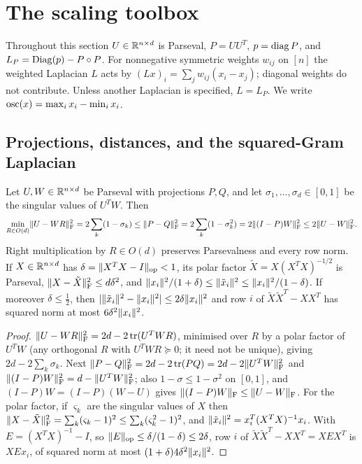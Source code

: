 \section{The scaling toolbox}\label{sec:toolbox}

Throughout this section $U\in\mathbb R^{n\times d}$ is Parseval, $P=UU^T$,
$p=\operatorname{diag} P$, and $L_P=\operatorname{Diag}(p)-P\circ P$. For nonnegative symmetric weights
$w_{ij}$ on $[n]$ the weighted Laplacian $L$ acts by
$(Lx)_i=\sum_jw_{ij}(x_i-x_j)$; diagonal weights do not contribute. Unless
another Laplacian is specified, $L=L_P$. We write $\operatorname{osc}(x)=\max_ix_i-\min_ix_i$.

\subsection{Projections, distances, and the squared-Gram Laplacian}

\begin{lemma}\label{lem:align}
Let $U,W\in\mathbb R^{n\times d}$ be Parseval with projections $P,Q$, and let
$\sigma_1,\dots,\sigma_d\in[0,1]$ be the singular values of $U^TW$. Then
\[
 \min_{R\in O(d)}\lVert U-WR\rVert_{\mathrm F}^2=2\sum_k(1-\sigma_k)\le
 \lVert P-Q\rVert_{\mathrm F}^2=2\sum_k(1-\sigma_k^2)=2\lVert (I-P)W\rVert_{\mathrm F}^2\le2\lVert U-W\rVert_{\mathrm F}^2 .
\]
Right multiplication by $R\in O(d)$ preserves Parsevalness and every row norm.
If $X\in\mathbb R^{n\times d}$ has $\delta=\lVert X^TX-I\rVert_{\mathrm{op}}<1$, its polar factor
$\tilde X=X(X^TX)^{-1/2}$ is Parseval, $\lVert X-\tilde X\rVert_{\mathrm F}^2\le d\delta^2$, and
$\lVert x_i\rVert^2/(1+\delta)\le\lVert \tilde x_i\rVert^2\le\lVert x_i\rVert^2/(1-\delta)$. If
moreover $\delta\le\frac12$, then $|\lVert \tilde x_i\rVert^2-\lVert x_i\rVert^2|\le2\delta\lVert x_i\rVert^2$
and row $i$ of $\tilde X\tilde X^T-XX^T$ has squared norm at most
$6\delta^2\lVert x_i\rVert^2$.
\end{lemma}

\begin{proof}
$\lVert U-WR\rVert_{\mathrm F}^2=2d-2\operatorname{tr}(U^TWR)$, minimised over $R$ by a polar factor of $U^TW$ (any orthogonal $R$ with $U^TWR\succeq0$; it need not be unique),
giving $2d-2\sum_k\sigma_k$. Next $\lVert P-Q\rVert_{\mathrm F}^2=2d-2\operatorname{tr}(PQ)=2d-2\lVert U^TW\rVert_{\mathrm F}^2$
and $\lVert (I-P)W\rVert_{\mathrm F}^2=d-\lVert U^TW\rVert_{\mathrm F}^2$; also $1-\sigma\le1-\sigma^2$ on $[0,1]$,
and $(I-P)W=(I-P)(W-U)$ gives $\lVert (I-P)W\rVert_{\mathrm F}\le\lVert U-W\rVert_{\mathrm F}$. For the polar factor, if $\varsigma_k$ are the singular values of $X$
then $\lVert X-\tilde X\rVert_{\mathrm F}^2=\sum_k(\varsigma_k-1)^2\le\sum_k(\varsigma_k^2-1)^2$, and
$\lVert \tilde x_i\rVert^2=x_i^T(X^TX)^{-1}x_i$. With $E=(X^TX)^{-1}-I$, so
$\lVert E\rVert_{\mathrm{op}}\le\delta/(1-\delta)\le2\delta$, row $i$ of $\tilde X\tilde X^T-XX^T=XEX^T$
is $XEx_i$, of squared norm at most $(1+\delta)4\delta^2\lVert x_i\rVert^2$.
\end{proof}

